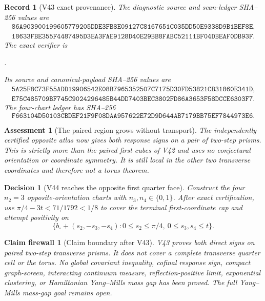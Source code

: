 \documentclass[11pt,oneside]{article}
\newtheorem{assessment}[theorem]{Assessment}
\newtheorem{firewall}[theorem]{Claim firewall}
\newtheorem{record}[theorem]{Record}
\newtheorem{decision}[theorem]{Decision}
\theoremstyle{definition}
\theoremstyle{remark}
\begin{document}
\begin{record}[V43 exact provenance]
\label{rec:newv43-provenance}
The diagnostic source and scan-ledger SHA--256 values are
\[
\begin{gathered}
\texttt{86A903900199605779205DDE3FB8E09127C8167651C035DD50E9338D9B1BEF8E},\\
\texttt{18633FBE355F4487495D3EA3FAE9128D40E29BB8FABC52111BF04DBEAF0DB93F}.
\end{gathered}                                         \tag{43.9}
\]
The exact verifier is
\begin{center}
\footnotesize
{}.
\end{center}
Its source and canonical-payload SHA--256 values are
\[
\begin{gathered}
\texttt{5A25F8C73F55ADD19906542E08B7965352507C7175D30FD53821CB31860E341D},\\
\texttt{E75C485709BF745C9024296485B44DD7403BEC3802FD86A3653F58DCCE6303F7}.
\end{gathered}                                         \tag{43.10}
\]
The four-chart ledger has SHA--256
\[
\texttt{F663104D50103CBDEF21F9F08DAA957622E72D9D644AB7179BB75EF7844973E6}.
                                                               \tag{43.11}
\]
\end{record}

\begin{assessment}[The paired region grows without transport]
\label{ass:newv43}
The independently certified opposite atlas now gives both response
signs on a pair of two-step prisms.  This is strictly more than the
paired first cubes of V42 and uses no conjectural orientation or
coordinate symmetry.  It is still local in the other two
transverse coordinates and therefore not a torus theorem.
\end{assessment}

\begin{decision}[V44 reaches the opposite first quarter face]
\label{dec:newv43-next}
Construct the four \(n_2=3\) opposite-orientation charts with
\(n_3,n_4\in\{0,1\}\).  After exact certification, use
\(\pi/4-3t<71/1792<1/8\) to cover the terminal first-coordinate cap
and attempt positivity on
\[
 \{b_\circ+(s_2,-s_3,-s_4):
      0\le s_2\le\pi/4,\ 0\le s_3,s_4\le t\}.          \tag{43.12}
\]
\end{decision}

\begin{firewall}[Claim boundary after V43]
\label{fire:newv43-final}
V43 proves both direct signs on paired two-step transverse prisms.
It does not cover a complete transverse quarter cell or the torus.
No global covariant inequality, cofinal response sign, compact
graph-screen, interacting continuum measure, reflection-positive
limit, exponential clustering, or Hamiltonian Yang--Mills mass gap
has been proved.  The full Yang--Mills mass-gap goal remains open.
\end{firewall}
\end{document}
